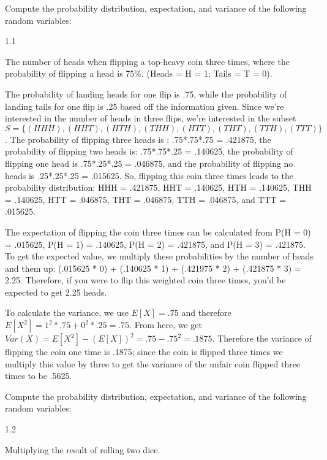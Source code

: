 \documentclass{article}
\author{Joshua Harthan}
\begin{document}
Compute the probability distribution, expectation, and variance of the following random variables:
\item[]1.1
\item[]The number of heads when flipping a top-heavy coin three times, where the probability of flipping a head is 75\%. (Heads = H = 1; Tails = T = 0).

The probability of landing heads for one flip is .75, while the probability of landing tails for one flip is .25 based off the information given. Since we're interested in the number of heads in three flips, we're interested in the subset 
$S = \{(HHH),(HHT),(HTH),(THH),(HTT),(THT),(TTH),(TTT)\}$. The probability of flipping three heads is : .75*.75*.75 = .421875, the probability of flipping two heads is: .75*.75*.25 = .140625, the probability of flipping one head is .75*.25*.25 = .046875, and the probability of flipping no heads is .25*.25*.25 = .015625. So, flipping this coin three times leads to the probability distribution: HHH = .421875, HHT = .140625, HTH = .140625, THH = .140625, HTT = .046875, THT = .046875, TTH = .046875, and TTT = .015625. 
\item The expectation of flipping the coin three times can be calculated from P(H = 0) = .015625, P(H = 1) = .140625, P(H = 2) = .421875, and P(H = 3) = .421875. To get the expected value, we multiply these probabilities by the number of heads and them up: (.015625 * 0) + (.140625 * 1) + (.421975 * 2) + (.421875 * 3) = 2.25. Therefore, if you were to flip this weighted coin three times, you'd be expected to get 2.25 heads. 
\item To calculate the variance, we use $E[X] = .75$ and therefore $E[X^{2}] = 1^{2}*.75+0^{2}*.25 = .75$. From here, we get $Var(X) = E[X^{2}] -(E[X])^{2} = .75 - .75^{2} = .1875$. Therefore the variance of flipping the coin one time is .1875; since the coin is flipped three times we multiply this value by three to get the variance of the unfair coin flipped three times to be .5625.

\clearpage
\header
Compute the probability distribution, expectation, and variance of the following random variables:
\item[]1.2
\item[]Multiplying the result of rolling two dice.
\end{document}
